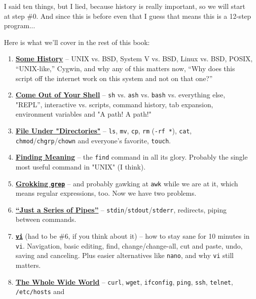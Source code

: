 \documentclass[10pt,american,]{book}
\numberwithin{figure}{chapter}
\begin{document}
I said ten things, but I lied, because history is really important, so
we will start at step \#0. And since this is before even that I guess
that means this is a 12-step program...

Here is what we'll cover in the rest of this book:

\begin{enumerate}
\def\labelenumi{\arabic{enumi}.}
\setcounter{enumi}{-1}
\item
  \protect\hyperlink{some-history}{\textbf{Some History}} – UNIX vs.
  BSD, System V vs. BSD, Linux vs. BSD, POSIX, “UNIX-like,” Cygwin, and
  why any of this matters now, “Why does this script off the internet
  work on this system and not on that one?”
\item
  \protect\hyperlink{come-out-of-your-shell}{\textbf{Come Out of Your
  Shell}} – \texttt{sh} vs. \texttt{ash} vs. \texttt{bash} vs.
  everything else, "REPL”, interactive vs. scripts, command history, tab
  expansion, environment variables and "A path! A path!"
\item
  \protect\hyperlink{file-under-directories}{\textbf{File Under
  "Directories"}} – \texttt{ls}, \texttt{mv}, \texttt{cp}, \texttt{rm}
  (\texttt{-rf\ *}), \texttt{cat},
  \texttt{chmod}/\texttt{chgrp}/\texttt{chown} and everyone's favorite,
  \texttt{touch}.
\item
  \protect\hyperlink{finding-meaning}{\textbf{Finding Meaning}} – the
  \texttt{find} command in all its glory. Probably the single most
  useful command in "UNIX" (I think).
\item
  \protect\hyperlink{grokking-grep}{\textbf{Grokking \texttt{grep}}} –
  and probably gawking at \texttt{awk} while we are at it, which means
  regular expressions, too. Now we have two problems.
\item
  \protect\hyperlink{just-a-series-of-pipes}{\textbf{“Just a Series of
  Pipes”}} – \texttt{stdin}/\texttt{stdout}/\texttt{stderr}, redirects,
  piping between commands.
\item
  \protect\hyperlink{vi}{\textbf{\texttt{vi}}} (had to be \#6, if you
  think about it) – how to stay sane for 10 minutes in \texttt{vi}.
  Navigation, basic editing, find, change/change-all, cut and paste,
  undo, saving and canceling. Plus easier alternatives like
  \texttt{nano}, and why \texttt{vi} still matters.
\item
  \protect\hyperlink{the-whole-wide-world}{\textbf{The Whole Wide
  World}} – \texttt{curl}, \texttt{wget}, \texttt{ifconfig},
  \texttt{ping}, \texttt{ssh}, \texttt{telnet}, \texttt{/etc/hosts} and

\end{enumerate}
\end{document}
